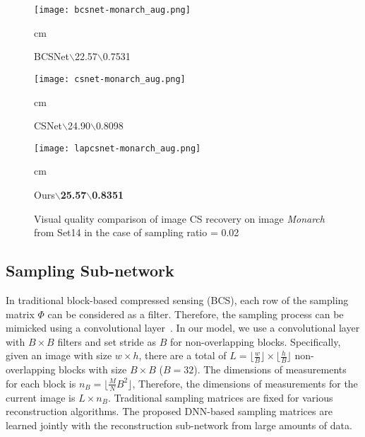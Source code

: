 \documentclass{article}
\begin{document}
\begin{figure*}[tb]
\begin{minipage}[t]{0.12\textwidth}
\centering
\texttt{[image: bcsnet-monarch\_aug.png]}
\begin{scriptsize}
\centering
{} cm \begin{tiny}BCSNet$\backslash$22.57$\backslash$0.7531\end{tiny}
\end{scriptsize}
\end{minipage}
\hfill
\begin{minipage}[t]{0.12\textwidth}
\centering
\texttt{[image: csnet-monarch\_aug.png]}
\begin{scriptsize}
\centering
{} cm \begin{tiny}CSNet$\backslash$24.90$\backslash$0.8098\end{tiny}
\end{scriptsize}
\end{minipage}
\hfill
\begin{minipage}[t]{0.12\textwidth}
\centering
\texttt{[image: lapcsnet-monarch\_aug.png]}
\begin{scriptsize}
\centering
{} cm \begin{tiny}Ours$\backslash$\textbf{25.57}$\backslash$\textbf{0.8351}\end{tiny}
\end{scriptsize}
\label{figure3}
\end{minipage}
\vspace{-0.5em} \caption{Visual quality comparison of image CS recovery on image \emph{Monarch} from Set14 in the case of sampling ratio = 0.02}
\label{figure3}
\end{figure*}



\subsection{Sampling Sub-network}
In traditional block-based compressed sensing (BCS), each row of the sampling matrix $\Phi$ can be considered as a filter. Therefore, the sampling process can be mimicked using a convolutional layer~\cite{adler2016deep,shi2017deep}. In our model, we use a convolutional layer with $B\times B$ filters and set stride as $B$ for non-overlapping blocks. Specifically, given an image with size $w \times h$, there are a total of $L = \lfloor\frac{w}{B}\rfloor\times \lfloor\frac{h}{B}\rfloor$ non-overlapping blocks with size $B \times B$ ($B = 32$). The dimensions of measurements for each block is $n_{B}=\lfloor\frac{M}{N}B^{2}\rfloor$, Therefore, the dimensions of measurements for the current image is $L \times n_{B}$. Traditional sampling matrices are fixed for various reconstruction algorithms. The proposed DNN-based sampling matrices are learned jointly with the reconstruction sub-network from large amounts of data.
\end{document}
